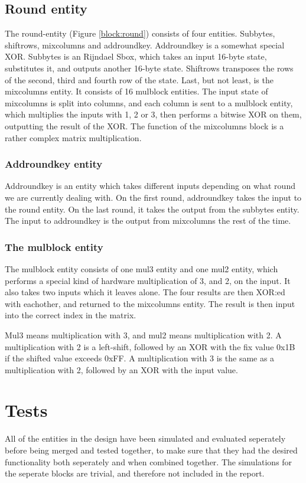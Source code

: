 \subsection{Round entity}
The round-entity (Figure \ref{block:round}) consists of four entities. Subbytes, 
shiftrows, mixcolumns and addroundkey. Addroundkey is a somewhat special XOR. 
Subbytes is an Rijndael Sbox, which takes an input 16-byte state, substitutes 
it, and outputs another 16-byte state. Shiftrows transposes the rows of the 
second, third and fourth row of the state. Last, but not least, is the 
mixcolumns entity. It consists of 16 mulblock entities. The input state of 
mixcolumns is split into columns, and each column is sent to a mulblock entity, 
which multiplies the inputs with 1, 2 or 3, then performs a bitwise XOR on them, 
outputting the result of the XOR. The function of the mixcolumns block is a 
rather complex matrix multiplication.

\subsubsection{Addroundkey entity}
Addroundkey is an entity which takes different inputs depending on 
what round we are currently dealing with. On the first round, addroundkey takes 
the input to the round entity. On the last round, it takes the output from the 
subbytes entity. The input to addroundkey is the output from mixcolumns the rest 
of the time.

\subsubsection{The mulblock entity}
The mulblock entity consists of one mul3 entity and one mul2 entity, which 
performs a special kind of hardware multiplication of 3, and 2, on the input. It 
also takes two inputs which it leaves alone. The four results are then XOR:ed 
with eachother, and returned to the mixcolumns entity. The result is then input 
into the correct index in the matrix. 

Mul3 means multiplication with 3, and mul2 means multiplication with 2. A 
multiplication with 2 is a left-shift, followed by an XOR with the fix value 0x1B
if the shifted value exceeds 0xFF. A multiplication with 3 is the same as a 
multiplication with 2, followed by an XOR with the input value.

\section{Tests}
All of the entities in the design have been simulated and evaluated seperately 
before being merged and tested together, to make sure that they had the desired 
functionality both seperately and when combined together. The simulations for the
seperate blocks are trivial, and therefore not included in the report.

